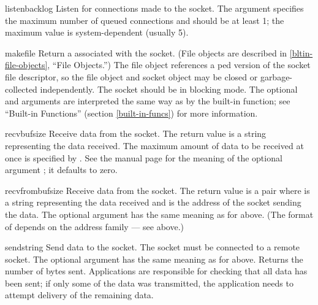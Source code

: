 \begin{methoddesc}[socket]{listen}{backlog}
Listen for connections made to the socket.  The  argument
specifies the maximum number of queued connections and should be at
least 1; the maximum value is system-dependent (usually 5).
\end{methoddesc}

\begin{methoddesc}[socket]{makefile}{}
Return a  associated with the socket.  (File objects
are described in \ref{bltin-file-objects}, ``File Objects.'')
The file object references a ped version of the
socket file descriptor, so the file object and socket object may be
closed or garbage-collected independently.
The socket should be in blocking mode.
The optional 
and  arguments are interpreted the same way as by the
built-in  function; see ``Built-in Functions''
(section \ref{built-in-funcs}) for more information.
\end{methoddesc}

\begin{methoddesc}[socket]{recv}{bufsize}
Receive data from the socket.  The return value is a string representing
the data received.  The maximum amount of data to be received
at once is specified by .  See the \UNIX{} manual page
 for the meaning of the optional argument
; it defaults to zero.
\end{methoddesc}

\begin{methoddesc}[socket]{recvfrom}{bufsize}
Receive data from the socket.  The return value is a pair
 where  is a string
representing the data received and  is the address of the
socket sending the data.  The optional  argument has the
same meaning as for  above.
(The format of  depends on the address family --- see above.)
\end{methoddesc}

\begin{methoddesc}[socket]{send}{string}
Send data to the socket.  The socket must be connected to a remote
socket.  The optional  argument has the same meaning as for
 above.  Returns the number of bytes sent.
Applications are responsible for checking that all data has been sent;
if only some of the data was transmitted, the application needs to
attempt delivery of the remaining data.
\end{methoddesc}


